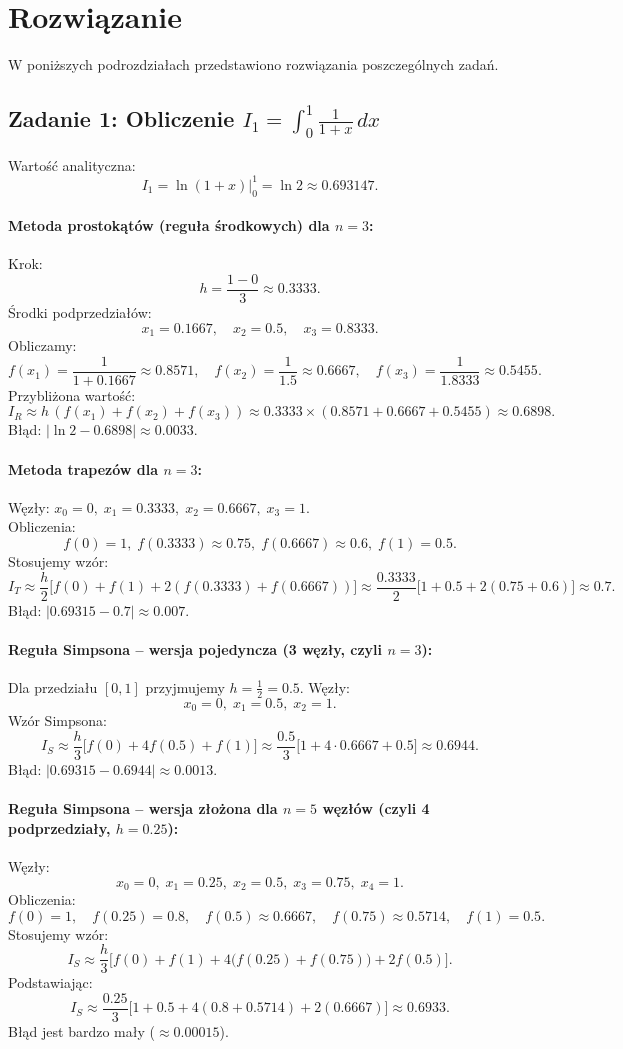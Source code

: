 \documentclass[a4paper,12pt]{article}
\begin{document}
\section{Rozwiązanie}
W poniższych podrozdziałach przedstawiono rozwiązania poszczególnych zadań.

\subsection*{Zadanie 1: Obliczenie \(\displaystyle I_1=\int_{0}^{1}\frac{1}{1+x}\,dx\)}
Wartość analityczna:
\[
I_1 = \ln(1+x)\Big|_{0}^{1} = \ln 2 \approx 0.693147.
\]

\paragraph{Metoda prostokątów (reguła środkowych) dla \(n=3\):}
Krok:
\[
h = \frac{1-0}{3} \approx 0.3333.
\]
Środki podprzedziałów:
\[
x_1=0.1667,\quad x_2=0.5,\quad x_3=0.8333.
\]
Obliczamy:
\[
f(x_1)=\frac{1}{1+0.1667}\approx0.8571,\quad f(x_2)=\frac{1}{1.5}\approx0.6667,\quad f(x_3)=\frac{1}{1.8333}\approx0.5455.
\]
Przybliżona wartość:
\[
I_R \approx h\,(f(x_1)+f(x_2)+f(x_3)) \approx 0.3333\times(0.8571+0.6667+0.5455) \approx 0.6898.
\]
Błąd: \(|\ln2 - 0.6898|\approx 0.0033.\)

\paragraph{Metoda trapezów dla \(n=3\):}
Węzły: \(x_0=0,\; x_1=0.3333,\; x_2=0.6667,\; x_3=1\).\\
Obliczenia:
\[
f(0)=1,\; f(0.3333)\approx0.75,\; f(0.6667)\approx0.6,\; f(1)=0.5.
\]
Stosujemy wzór:
\[
I_T \approx \frac{h}{2}\Big[f(0)+f(1)+2(f(0.3333)+f(0.6667))\Big] \approx \frac{0.3333}{2}\Big[1+0.5+2(0.75+0.6)\Big]\approx 0.7.
\]
Błąd: \(|0.69315-0.7|\approx 0.007.\)

\paragraph{Reguła Simpsona \cite{Funika} -- wersja pojedyncza (3 węzły, czyli \(n=3\)):}
Dla przedziału \([0,1]\) przyjmujemy \(h=\frac{1}{2}=0.5\). Węzły:
\[
x_0=0,\; x_1=0.5,\; x_2=1.
\]
Wzór Simpsona:
\[
I_S \approx \frac{h}{3}\Big[f(0)+4f(0.5)+f(1)\Big] \approx \frac{0.5}{3}\Big[1+4\cdot0.6667+0.5\Big] \approx 0.6944.
\]
Błąd: \(|0.69315-0.6944|\approx 0.0013.\)
\paragraph{Reguła Simpsona -- wersja złożona dla \(n=5\) węzłów (czyli 4 podprzedziały, \(h=0.25\)):}
Węzły:
\[
x_0=0,\; x_1=0.25,\; x_2=0.5,\; x_3=0.75,\; x_4=1.
\]
Obliczenia:
\[
f(0)=1,\quad f(0.25)=0.8,\quad f(0.5)\approx0.6667,\quad f(0.75)\approx0.5714,\quad f(1)=0.5.
\]
Stosujemy wzór:
\[
I_S \approx \frac{h}{3}\Big[f(0)+f(1)+4\big(f(0.25)+f(0.75)\big)+2f(0.5)\Big].
\]
Podstawiając:
\[
I_S \approx \frac{0.25}{3}\Big[1+0.5+4(0.8+0.5714)+2(0.6667)\Big] \approx 0.6933.
\]
Błąd jest bardzo mały (\(\approx 0.00015\)).
\end{document}
